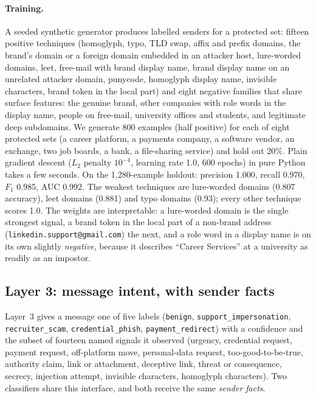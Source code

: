 \documentclass[10pt,twocolumn]{article}
\newcommand{\code}[1]{\texttt{#1}}
\begin{document}
\paragraph{Training.} A seeded synthetic generator produces labelled senders for a protected set: fifteen positive techniques (homoglyph, typo, TLD swap, affix and prefix domains, the brand's domain or a foreign domain embedded in an attacker host, lure-worded domains, leet, free-mail with brand display name, brand display name on an unrelated attacker domain, punycode, homoglyph display name, invisible characters, brand token in the local part) and eight negative families that share surface features: the genuine brand, other companies with role words in the display name, people on free-mail, university offices and students, and legitimate deep subdomains. We generate 800 examples (half positive) for each of eight protected sets (a career platform, a payments company, a software vendor, an exchange, two job boards, a bank, a file-sharing service) and hold out 20\%. Plain gradient descent ($L_2$ penalty $10^{-4}$, learning rate 1.0, 600 epochs) in pure Python takes a few seconds. On the 1{,}280-example holdout: precision 1.000, recall 0.970, $F_1$ 0.985, AUC 0.992. The weakest techniques are lure-worded domains (0.807 accuracy), leet domains (0.881) and typo domains (0.93); every other technique scores 1.0. The weights are interpretable: a lure-worded domain is the single strongest signal, a brand token in the local part of a non-brand address (\code{linkedin.support@gmail.com}) the next, and a role word in a display name is on its own slightly \emph{negative}, because it describes ``Career Services'' at a university as readily as an impostor.

\subsection{Layer 3: message intent, with sender facts}
\label{sec:l3}

Layer~3 gives a message one of five labels (\code{benign}, \code{support\_impersonation}, \code{recruiter\_scam}, \code{credential\_phish}, \code{payment\_redirect}) with a confidence and the subset of fourteen named signals it observed (urgency, credential request, payment request, off-platform move, personal-data request, too-good-to-be-true, authority claim, link or attachment, deceptive link, threat or consequence, secrecy, injection attempt, invisible characters, homoglyph characters). Two classifiers share this interface, and both receive the same \emph{sender facts}.
\end{document}
